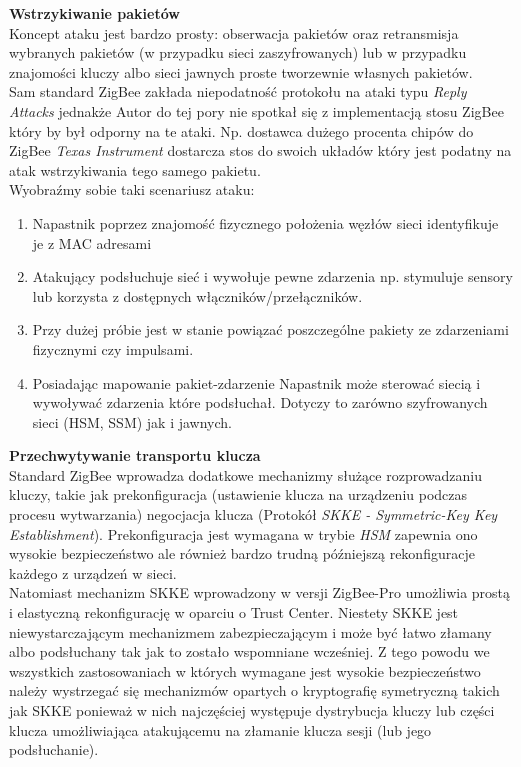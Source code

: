 \par
\tab \textbf{Wstrzykiwanie pakietów} \\
Koncept ataku jest bardzo prosty: obserwacja pakietów oraz retransmisja wybranych pakietów (w przypadku sieci zaszyfrowanych) lub w przypadku znajomości kluczy albo sieci jawnych proste tworzewnie własnych pakietów. \\
Sam standard ZigBee zakłada niepodatność protokołu na ataki typu \textit{Reply Attacks} jednakże Autor do tej pory nie spotkał się z implementacją stosu ZigBee który by był odporny na te ataki. Np. dostawca dużego procenta chipów do ZigBee \textit{Texas Instrument} dostarcza stos do swoich układów który jest podatny na atak wstrzykiwania tego samego pakietu. \\
Wyobraźmy sobie taki scenariusz ataku:
\begin{enumerate}
	\item Napastnik poprzez znajomość fizycznego położenia węzłów sieci identyfikuje je z MAC adresami
	\item Atakujący podsłuchuje sieć i wywołuje pewne zdarzenia np. stymuluje sensory lub korzysta z dostępnych włączników/przełączników.
	\item Przy dużej próbie jest w stanie powiązać poszczególne pakiety ze zdarzeniami fizycznymi czy impulsami.
	\item Posiadając mapowanie pakiet-zdarzenie Napastnik może sterować siecią i wywoływać zdarzenia które podsłuchał. Dotyczy to zarówno szyfrowanych sieci (HSM, SSM) jak i jawnych.
\end{enumerate}  

\par
\tab \textbf{Przechwytywanie transportu klucza} \\
Standard ZigBee wprowadza dodatkowe mechanizmy służące rozprowadzaniu kluczy, takie jak prekonfiguracja (ustawienie klucza na urządzeniu podczas procesu wytwarzania) negocjacja klucza (Protokół \textit{SKKE - Symmetric-Key Key Establishment}). Prekonfiguracja jest wymagana w trybie \textit{HSM} zapewnia ono wysokie bezpieczeństwo ale również bardzo trudną późniejszą rekonfiguracje każdego z urządzeń w sieci.\\
Natomiast mechanizm SKKE wprowadzony w versji ZigBee-Pro umożliwia prostą i elastyczną rekonfigurację w oparciu o Trust Center. Niestety SKKE jest niewystarczającym mechanizmem zabezpieczającym i może być łatwo złamany albo podsłuchany tak jak to zostało wspomniane wcześniej. Z tego powodu we wszystkich zastosowaniach w których wymagane jest wysokie bezpieczeństwo należy wystrzegać się mechanizmów opartych o kryptografię symetryczną takich jak SKKE ponieważ w nich najczęściej występuje dystrybucja kluczy lub części klucza umożliwiająca atakującemu na złamanie klucza sesji (lub jego podsłuchanie).


